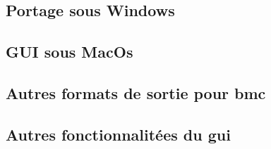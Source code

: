 
\subsection{Portage sous Windows}

\subsection{GUI sous MacOs}

\subsection{Autres formats de sortie pour bmc}

\subsection{Autres fonctionnalitées du gui}

